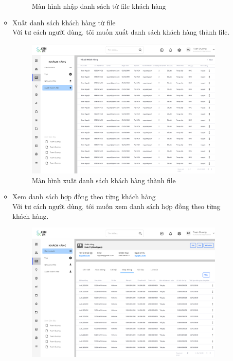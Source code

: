 \documentclass[12pt,a4paper]{article}
\begin{document}
\begin{enumerate}
\begin{itemize}
\begin{figure}[H]
                \caption{Màn hình nhập danh sách từ file khách hàng}
                \label{importKH}
            \end{figure}
            \item Xuất danh sách khách hàng từ file
            \\Với tư cách người dùng, tôi muốn xuất danh sách khách hàng thành file.
            \begin{figure}[H]
                \centering \includegraphics[width=\textwidth]{Img/Nguyet/Khachhang/exportKH.png}
                \vspace{0.5cm}
                \caption{Màn hình xuất danh sách khách hàng thành file}
                \label{exportKH}
            \end{figure}
            \item Xem danh sách hợp đồng theo từng khách hàng
            \\Với tư cách người dùng, tôi muốn xem danh sách hợp đồng theo từng khách hàng.
            \begin{figure}[H]
                \centering \includegraphics[width=\textwidth]{Img/Nguyet/Khachhang/danhsachhopdongKH.png}

\end{figure}
\end{itemize}
\end{enumerate}
\end{document}
